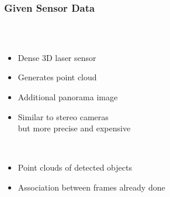 \begin{frame}
  \frametitle{Given Sensor Data}

  \begin{columns}
  \begin{column}{0.6\textwidth}
  \begin{description}[]
  \item[Sensor] \hfill \\
  \begin{itemize}
  \item Dense 3D laser sensor
  \item Generates point cloud
  \item Additional panorama image
  \item Similar to stereo cameras\\
        but more precise and expensive
  \end{itemize}
  \pause
  \item[Given for us] \hfill \\
  \begin{itemize}
  \item Point clouds of detected objects
  \item Association between frames already done
  \end{itemize}
  \end{description}
  \end{column}
  \begin{column}{0.4\textwidth}


\end{column}
\end{columns}
\end{frame}

